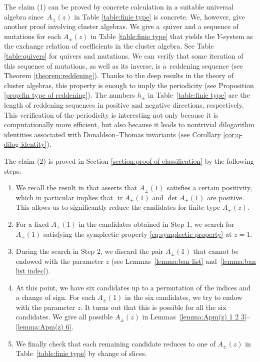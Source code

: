 \documentclass[10pt,a4paper]{amsart}
\numberwithin{equation}{section}
\theoremstyle{definition}
\DeclareMathOperator{\tr}{tr}
\begin{document}
The claim (1) can be proved by concrete calculation in a suitable universal algebra
since~$A_\pm (z)$ in Table \ref{table:finie type} is concrete.
We, however, give another proof involving cluster algebras.
We give a~quiver and a sequence of mutations for each $A_\pm (z)$ in Table \ref{table:finie type}
that yields the $Y$-system as the exchange relation of coefficients
in the cluster algebra. See Table \ref{table:quivers} for quivers and mutations.
We can verify that some iteration of this sequence of mutations, as well as its inverse, is a~reddening sequence (see Theorem \ref{theorem:reddening}).
Thanks to the deep results in the theory of cluster algebras,
this property is enough to imply the periodicity (see Proposition \ref{prop:fin type of reddening}).
The numbers $h_\pm$ in Table~\ref{table:finie type} are the length of reddening sequences
in positive and negative directions, respectively.
This verification of the periodicity is interesting not only because it is computationally more efficient,
but also because it leads to nontrivial dilogarithm identities associated with
Donaldson--Thomas invariants (see Corollary \ref{cor:q-dilog identity}).

The claim (2) is proved in Section \ref{section:proof of classification} by the following steps:
\begin{enumerate}[label=Step \arabic*., leftmargin=*, itemindent=3em]\itemsep=0pt
 \item We recall the result in \cite{mizuno2020difference} that
 asserts that $A_\pm(1)$ satisfies a certain positivity,
 which in particular implies that $\tr A_\pm (1)$ and $\det A_\pm(1)$
 are positive. This allows us to significantly reduce the candidates for finite type $A_\pm(z)$.
 \item For a fixed $A_+(1)$ in the candidates obtained in Step 1, we search for $A_-(1)$
 satisfying the symplectic property \eqref{eq:symplectic property} at $z=1$.
 \item During the search in Step 2, we discard the pair $A_\pm (1)$ that cannot be endowed with
 the parameter $z$ (see Lemmas~\ref{lemma:ban list} and~\ref{lemma:ban list indec}).
 \item At this point, we have six candidates up to a permutation of the indices
 and a change of sign. For each $A_\pm(1)$ in the six candidates, we try to endow with the
 parameter $z$. It turns out that this is possible for all the six candidates.
 We give all possible $A_\pm(z)$ in Lemmas~\ref{lemma:Apm(z) 1 2 3}--\ref{lemma:Apm(z) 6}.
 \item We finally check that each remaining candidate reduces to one of $A_\pm (z)$ in
 Table~\ref{table:finie type} by change of slices.
\end{enumerate}
\end{document}
